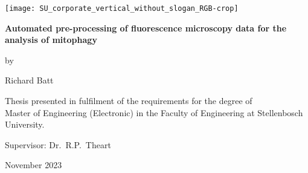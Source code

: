 \graphicspath{{frontmatter/fig/}}

\begin{titlepage}
	\begin{center}
		
        \texttt{[image: SU\_corporate\_vertical\_without\_slogan\_RGB-crop]}
				
		\vfill
		
		{\sffamily \bfseries \huge Automated pre-processing of fluorescence microscopy data for the analysis of mitophagy \par}
		
		\vfill
		
        {\large by \\[5pt]}
		{\large {\Large Richard Batt} \par}
		
		\vfill
		
		\vfill
		
		
		{\large Thesis presented in fulfilment of the requirements for the degree of \\ Master of Engineering (Electronic) in the Faculty of Engineering at Stellenbosch University. \par}
		
		
		
		\vfill
		
		{\large {Supervisor}: Dr.\ R.P.\ Theart}\par
		
		\vfill
		
		{\Large November 2023}
	\end{center}
\end{titlepage}
